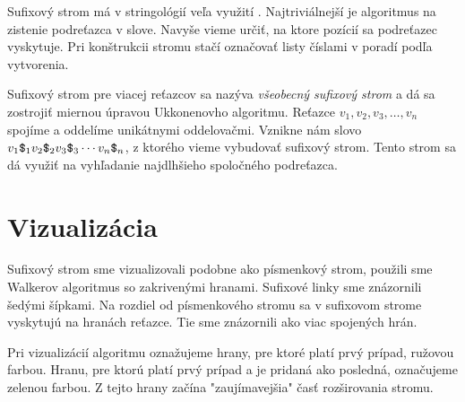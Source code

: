 Sufixový strom má v stringológií veľa využití
\citep{gusfield}. Najtriviálnejší je algoritmus na zistenie podreťazca v 
slove. Navyše vieme určiť, na ktore pozícií sa podreťazec vyskytuje. Pri 
konštrukcii stromu stačí označovať listy číslami v poradí podľa vytvorenia. 

Sufixový strom pre viacej reťazcov sa nazýva \emph{všeobecný sufixový strom} 
a dá sa zostrojiť miernou úpravou Ukkonenovho algoritmu. Reťazce $v_1, v_2, 
v_3, \ldots, v_n$ spojíme a oddelíme unikátnymi oddelovačmi. Vznikne nám slovo 
$v_1\hbox{\tt\$}_1v_2\hbox{\tt\$}_2v_3\hbox{\tt\$}_3\cdots v_n\hbox{\tt\$}_n$, z ktorého vieme vybudovať sufixový 
strom. Tento strom sa dá využiť na vyhľadanie najdlhšieho spoločného 
podreťazca. 

\section{Vizualizácia}

Sufixový strom sme vizualizovali podobne ako písmenkový strom, použili sme 
Walkerov algoritmus \citep{walker} so zakrivenými hranami. Sufixové linky 
sme znázornili šedými šípkami. Na rozdiel od písmenkového stromu sa v 
sufixovom strome vyskytujú na hranách reťazce. Tie sme znázornili ako viac 
spojených hrán.

Pri vizualizácií algoritmu oznažujeme hrany, pre ktoré platí prvý prípad, 
ružovou farbou. Hranu, pre ktorú platí prvý prípad a je pridaná ako posledná, 
označujeme zelenou farbou. Z tejto hrany začína "zaujímavejšia" časť 
rozširovania stromu.



